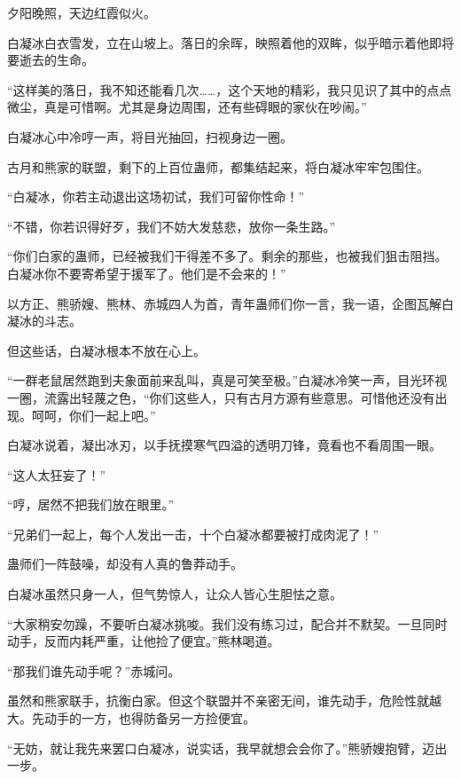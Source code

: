 
\begin{this_body}



夕阳晚照，天边红霞似火。

白凝冰白衣雪发，立在山坡上。落日的余晖，映照着他的双眸，似乎暗示着他即将要逝去的生命。

“这样美的落日，我不知还能看几次……，这个天地的精彩，我只见识了其中的点点微尘，真是可惜啊。尤其是身边周围，还有些碍眼的家伙在吵闹。”

白凝冰心中冷哼一声，将目光抽回，扫视身边一圈。

古月和熊家的联盟，剩下的上百位蛊师，都集结起来，将白凝冰牢牢包围住。

“白凝冰，你若主动退出这场初试，我们可留你性命！”

“不错，你若识得好歹，我们不妨大发慈悲，放你一条生路。”

“你们白家的蛊师，已经被我们干得差不多了。剩余的那些，也被我们狙击阻挡。白凝冰你不要寄希望于援军了。他们是不会来的！”

以方正、熊骄嫂、熊林、赤城四人为首，青年蛊师们你一言，我一语，企图瓦解白凝冰的斗志。

但这些话，白凝冰根本不放在心上。

“一群老鼠居然跑到夫象面前来乱叫，真是可笑至极。”白凝冰冷笑一声，目光环视一圈，流露出轻蔑之色，“你们这些人，只有古月方源有些意思。可惜他还没有出现。呵呵，你们一起上吧。”

白凝冰说着，凝出冰刃，以手抚摸寒气四溢的透明刀锋，竟看也不看周围一眼。

“这人太狂妄了！”

“哼，居然不把我们放在眼里。”

“兄弟们一起上，每个人发出一击，十个白凝冰都要被打成肉泥了！”

蛊师们一阵鼓噪，却没有人真的鲁莽动手。

白凝冰虽然只身一人，但气势惊人，让众人皆心生胆怯之意。

“大家稍安勿躁，不要听白凝冰挑唆。我们没有练习过，配合并不默契。一旦同时动手，反而内耗严重，让他捡了便宜。”熊林喝道。

“那我们谁先动手呢？”赤城问。

虽然和熊家联手，抗衡白家。但这个联盟并不亲密无间，谁先动手，危险性就越大。先动手的一方，也得防备另一方捡便宜。

“无妨，就让我先来罢口白凝冰，说实话，我早就想会会你了。”熊骄嫂抱臂，迈出一步。


\end{this_body}

